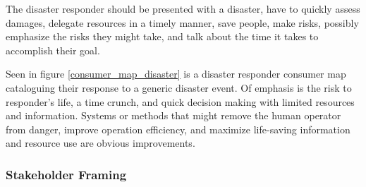 \documentclass[a4paper, 10pt]{article}
\begin{document}
		The disaster responder should be presented with a disaster, have to quickly assess damages, delegate resources in a timely manner, save people, make risks, possibly emphasize the risks they might take, and talk about the time it takes to accomplish their goal. 
		
		Seen in figure \ref{consumer_map_disaster} is a disaster responder consumer map cataloguing their response to a generic disaster event. Of emphasis is the risk to responder's life, a time crunch, and quick decision making with limited resources and information. Systems or methods that might remove the human operator from danger, improve operation efficiency, and maximize life-saving information and resource use are obvious improvements.
		
		
		\subsubsection{Stakeholder Framing}		
\end{document}
